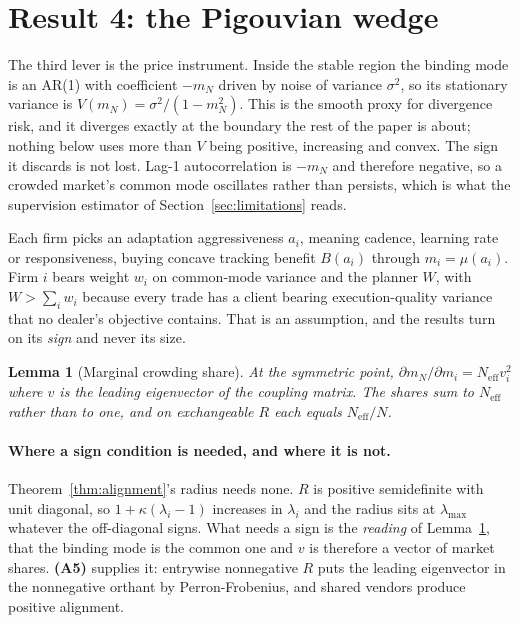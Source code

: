 \documentclass{article}
\theoremstyle{plain}
\newtheorem{lemma}[theorem]{Lemma}
\theoremstyle{definition}
\newcommand{\Neff}{N_{\mathrm{eff}}}
\newcommand{\mN}{m_N}
\newcommand{\lmax}{\lambda_{\max}}
\begin{document}
\section{Result 4: the Pigouvian wedge}
\label{sec:wedge}

The third lever is the price instrument. Inside the stable region the binding mode is an AR(1) with coefficient $-\mN$ driven by noise of variance $\sigma^2$, so its stationary variance is $V(\mN) = \sigma^2/(1-\mN^2)$. This is the smooth proxy for divergence risk, and it diverges exactly at the boundary the rest of the paper is about; nothing below uses more than $V$ being positive, increasing and convex. The sign it discards is not lost. Lag-1 autocorrelation is $-\mN$ and therefore negative, so a crowded market's common mode oscillates rather than persists, which is what the supervision estimator of Section~\ref{sec:limitations} reads.

Each firm picks an adaptation aggressiveness $a_i$, meaning cadence, learning rate or responsiveness, buying concave tracking benefit $B(a_i)$ through $m_i = \mu(a_i)$. Firm $i$ bears weight $w_i$ on common-mode variance and the planner $W$, with $W > \sum_i w_i$ because every trade has a client bearing execution-quality variance that no dealer's objective contains. That is an assumption, and the results turn on its \emph{sign} and never its size.

\begin{lemma}[Marginal crowding share]
\label{lem:share}
At the symmetric point, $\partial \mN/\partial m_i = \Neff v_i^2$ where $v$ is the leading eigenvector of the coupling matrix. The shares sum to $\Neff$ rather than to one, and on exchangeable $R$ each equals $\Neff/N$.
\end{lemma}

\paragraph{Where a sign condition is needed, and where it is not.}
Theorem~\ref{thm:alignment}'s radius needs none. $R$ is positive semidefinite with unit diagonal, so $1+\kappa(\lambda_i-1)$ increases in $\lambda_i$ and the radius sits at $\lmax$ whatever the off-diagonal signs. What needs a sign is the \emph{reading} of Lemma~\ref{lem:share}, that the binding mode is the common one and $v$ is therefore a vector of market shares. \textbf{(A5)} supplies it: entrywise nonnegative $R$ puts the leading eigenvector in the nonnegative orthant by Perron-Frobenius, and shared vendors produce positive alignment.
\end{document}
